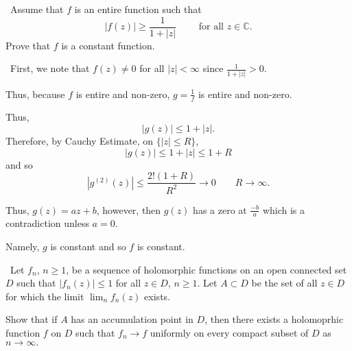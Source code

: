 \documentclass[12pt]{Homework}
\begin{document}
\begin{problem} $\,$
Assume that $f$ is an entire function such that $$|f(z)|\ge\frac{1}{1+|z|}\qquad\text{ for all }z\in\mathbb{C}.$$ Prove that $f$ is a constant function.
\end{problem}

\begin{solution}$\,$
First, we note that $f(z)\not=0$ for all $|z|<\infty$ since $\frac{1}{1+|z|}>0$. 

Thus, because $f$ is entire and non-zero, $g=\frac{1}{f}$ is entire and non-zero.

Thus, $$|g(z)|\le 1+|z|.$$ Therefore, by Cauchy Estimate, on $\{|z|\le R\}$, $$|g(z)|\le 1+|z|\le 1+R$$ and so $$|g^{(2)}(z)|\le \frac{2!(1+R)}{R^2}\to0\qquad R\to\infty.$$ 

Thus, $g(z)=az+b$, however, then $g(z)$ has a zero at $\frac{-b}{a}$ which is a contradiction unless $a=0.$

Namely, $g$ is constant and so $f$ is constant.
\end{solution}
\newpage




\begin{problem} $\,$
Let $f_n$, $n\ge1$, be a sequence of holomorphic functions on an open connected set $D$ such that $|f_n(z)|\le 1$ for all $z\in D$, $n\ge1$. Let $A\subset D$ be the set of all $z\in D$ for which the limit $\lim_nf_n(z)$ exists.

Show that if $A$ has an accumulation point in $D$, then there exists a holomoprhic function $f$ on $D$ such that $f_n\to f$ uniformly on every compact subset of $D$ as $n\to\infty.$
\end{problem}
\end{document}
